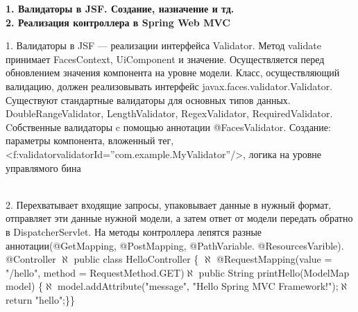 \documentclass{article}
\newcommand{\bil}[4]{%
    \begin{minipage}{.3\textwidth}
        \textbf{1. #1} \\
        \textbf{2. #2}

        1. #3
        \\
        2. #4
    \end{minipage}
}
\begin{document}
\hfill
\bil{Валидаторы в JSF. Создание, назначение и тд.}{Реализация контроллера в Spring Web MVC}{
    Валидаторы в JSF — реализации интерфейса Validator. Метод validate принимает FacesContext, UiComponent и значение.
    Осуществляется перед обновлением значения компонента на уровне модели. Класс, осуществляющий валидацию, должен реализовывать 
    интерфейс javax.faces.validator.Validator. Существуют стандартные валидаторы для основных типов данных.  
    DoubleRangeValidator, LengthValidator, RegexValidator, RequiredValidator. Cобственные валидаторы c помощью аннотации @FacesValidator.
    Создание: параметры компонента, вложенный тег, <f:validatorvalidatorId=”com.example.MyValidator”/>, логика на уровне управлямого бина
}{
    Перехватывает входящие запросы, упаковывает данные в нужный формат, отправляет эти данные нужной модели, а затем ответ от модели передать обратно в DispatcherServlet. 
    На методы контроллера лепятся разные аннотации(@GetMapping, @PostMapping, @PathVariable. @ResourcesVarible).
    @Controller $\aleph$ public class HelloController \{ $\aleph$ @RequestMapping(value = "/hello", method = RequestMethod.GET)$\aleph$ 
    public String printHello(ModelMap  model) \{$\aleph$ 
    model.addAttribute("message", "Hello Spring MVC Framework!");$\aleph$
    return "hello";\}\}
}
\hfill
\end{document}
